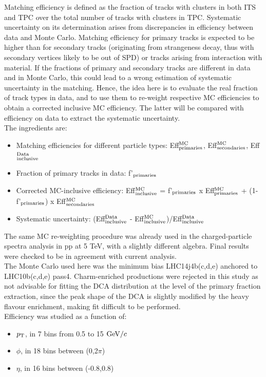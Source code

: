 Matching efficiency is defined as the fraction of tracks with 
clusters in both ITS and TPC over the total number of tracks with clusters in TPC.
Systematic uncertainty on its determination arises from discrepancies 
in efficiency between data and Monte Carlo.
Matching efficiency for primary tracks is expected to be higher than 
for secondary tracks (originating from strangeness decay, thus 
with secondary vertices likely to be out of SPD) or tracks arising
 from interaction with material.
If the fractions of primary and secondary tracks are different in data 
and in Monte Carlo, this could lead to a wrong estimation of systematic 
uncertainty in the matching. Hence, the idea here is to evaluate the
 real fraction of track types in data, and to use them to re-weight respective MC efficiencies 
to obtain a corrected inclusive MC efficiency. The latter will be compared 
with efficiency on data to extract the systematic uncertainty.\\
The ingredients are:
\begin{itemize}
\item Matching efficiencies for different particle types: 
Eff$^{\rm MC}_{\rm primaries}$, Eff$^{\rm MC}_{\rm secondaries}$, Eff$^{\rm Data}_{\rm inclusive}$
\item Fraction of primary tracks in data: f'$_{\rm primaries}$
\item Corrected MC-inclusive efficiency: 
Eff$^{\rm MC}_{\rm inclusive}$ = f'$_{\rm primaries}$ x Eff$^{\rm MC}_{\rm primaries}$ + (1- f'$_{\rm primaries}$) x Eff$^{\rm MC}_{\rm secondaries}$
\item Systematic uncertainty: 
(Eff$^{\rm Data}_{\rm inclusive}$ - Eff$^{\rm MC}_{\rm inclusive}$)/Eff$^{\rm Data}_{\rm inclusive}$
\end{itemize}
The same MC re-weighting procedure was already used in the 
charged-particle spectra analysis in pp at 5 TeV, with a slightly 
different algebra. Final results were checked to be in 
agreement with current analysis. \\
The Monte Carlo used here was the minimum bias 
LHC14j4b(c,d,e) anchored to LHC10b(c,d,e) pass4. 
Charm-enriched productions were rejected in this study as not
 advisable for fitting the DCA distribution at the level of the primary
  fraction extraction, since the peak shape of the DCA is slightly modified 
by the heavy flavour enrichment, making fit difficult to be performed. \\
Efficiency was studied as a function of:
\begin{itemize}
\item $p_{\rm T}$, in 7 bins from 0.5 to 15 $\mathrm{GeV}/c$
\item $\phi$, in 18 bins between (0,2$\pi$)
\item $\eta$, in 16 bins between (-0.8,0.8)
\end{itemize}

